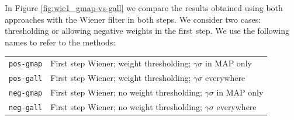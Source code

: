 \documentclass{ipol}
\begin{document}
In Figure \ref{fig:wie1_gmap-vs-gall} we compare the results obtained using both approaches with the
Wiener filter in both steps. We consider two cases: thresholding or allowing
negative weights in the first step. We use the following names to refer to the methods:
\begin{center}
\begin{tabular}{c l}
	\verb+pos-gmap+ & First step Wiener; weight thresholding; $\gamma\sigma$ in MAP only\\
	\verb+pos-gall+ & First step Wiener; weight thresholding; $\gamma\sigma$ everywhere \\
	\verb+neg-gmap+ & First step Wiener; no weight thresholding; $\gamma\sigma$ in MAP only\\
	\verb+neg-gall+ & First step Wiener; no weight thresholding; $\gamma\sigma$ everywhere \\
\end{tabular}
\end{center}
\end{document}
